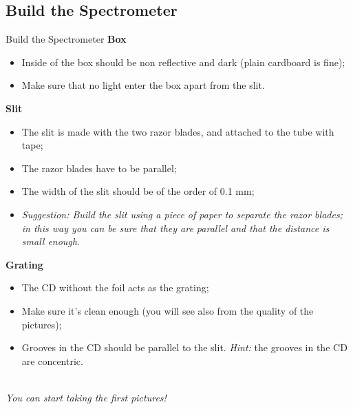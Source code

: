 \documentclass[9pt, xcolor=dvipsnames]{beamer}
\begin{document}
\subsection{Build the Spectrometer}
\begin{frame}{Build the Spectrometer}
	\textbf{Box}
	\begin{itemize}
		\item Inside of the box should be non reflective and dark (plain cardboard is fine);
		\item Make sure that no light enter the box apart from the slit.
	\end{itemize}
	\textbf{Slit}
	\begin{itemize}
		\item The slit is made with the two razor blades, and attached to the tube with tape;
		\item The razor blades have to be parallel;
		\item The width of the slit should be of the order of 0.1 mm;
		\item \textit{Suggestion: Build the slit using a piece of paper to separate the razor blades; in this way you can be sure that they are parallel and that the distance is small enough}.
	\end{itemize}
		\textbf{Grating}
	\begin{itemize}
		\item The CD without the foil acts as the grating;
		\item Make sure it's clean enough (you will see also from the quality of the pictures);
		\item Grooves in the CD should be parallel to the slit. \textit{Hint:} the grooves in the CD are concentric.
	\end{itemize}
~\\

\textit{You can start taking the first pictures!}
\end{frame}
\end{document}
